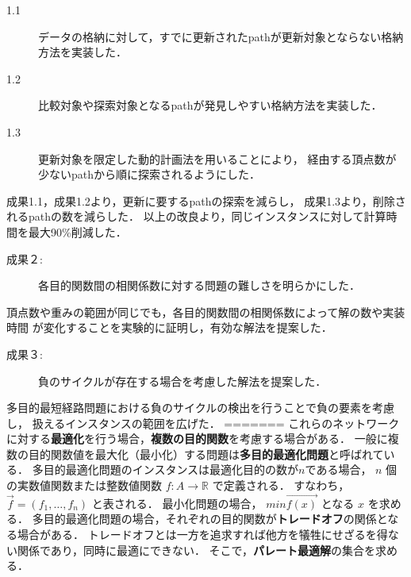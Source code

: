 \documentclass[oneside, 10pt, twocolumn]{jarticle}
\begin{document}
\begin{description}
  \item[1.1]
  データの格納に対して，すでに更新されたpathが更新対象とならない格納方法を実装した．
\end{description}

\begin{description}
  \item[1.2]
  比較対象や探索対象となるpathが発見しやすい格納方法を実装した．
\end{description}

\begin{description}
  \item[1.3]
  更新対象を限定した動的計画法を用いることにより，
  経由する頂点数が少ないpathから順に探索されるようにした．
\end{description}

成果1.1，成果1.2より，更新に要するpathの探索を減らし，
成果1.3より，削除されるpathの数を減らした．
以上の改良より，同じインスタンスに対して計算時間を最大90\%削減した．

\begin{description}
  \item[成果２:]
  各目的関数間の相関係数に対する問題の難しさを明らかにした．
\end{description}

頂点数や重みの範囲が同じでも，各目的関数間の相関係数によって解の数や実装時間
が変化することを実験的に証明し，有効な解法を提案した．

\begin{description}
  \item[成果３:]
  負のサイクルが存在する場合を考慮した解法を提案した．
\end{description}

多目的最短経路問題における負のサイクルの検出を行うことで負の要素を考慮し，
扱えるインスタンスの範囲を広げた．
=======
これらのネットワークに対する\textbf{最適化}を行う場合，\textbf{複数の目的関数}を考慮する場合がある．
一般に複数の目的関数値を最大化（最小化）する問題は\textbf{多目的最適化問題}と呼ばれている．
多目的最適化問題のインスタンスは最適化目的の数が$n$である場合，
$n$ 個の実数値関数または整数値関数 $f : A \rightarrow \mathbb{R}$ で定義される．
すなわち， $\vec{f} = (f_1 , \ldots , f_n)$ と表される．
最小化問題の場合， $min\vec{f(x)}$ となる $x$ を求める．
多目的最適化問題の場合，それぞれの目的関数が\textbf{トレードオフ}の関係となる場合がある．
トレードオフとは一方を追求すれば他方を犠牲にせざるを得ない関係であり，同時に最適にできない．
そこで，\textbf{パレート最適解}の集合を求める．
\end{document}
